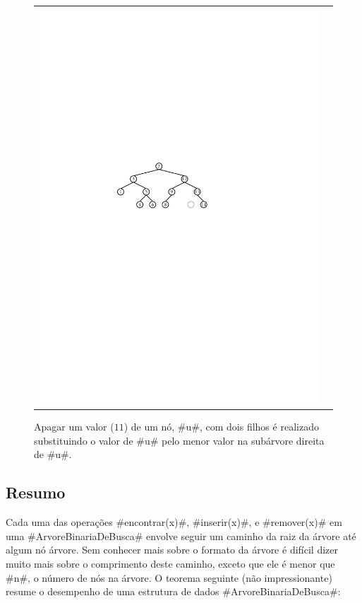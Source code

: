 \begin{figure}
\begin{center}
\begin{tabular}{cc}
    \includegraphics[width=\HalfScaleIfNeeded]{figs/bst-delete-2}
    \end{tabular}
  \end{center}
  \caption[Apagar de uma ArvoreBinariaDeBusca]{Apagar um valor ($11$) de um nó, #u#, com dois filhos é realizado substituindo o valor de #u# pelo menor valor na subárvore direita de #u#.}
\end{figure}

\subsection{Resumo}

Cada uma das operações #encontrar(x)#, #inserir(x)#, e #remover(x)# em uma
#ArvoreBinariaDeBusca# envolve seguir um caminho da raiz da árvore até algum nó árvore. Sem conhecer mais sobre o formato da árvore é difícil dizer muito mais sobre o comprimento deste caminho, exceto que ele é menor que #n#, o número de nós na árvore.
O teorema seguinte (não impressionante) resume o desempenho de uma estrutura de dados #ArvoreBinariaDeBusca#:

